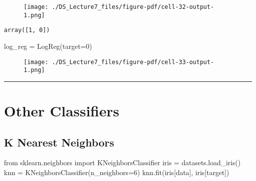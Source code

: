 \documentclass[
  letterpaper,
  DIV=11,
  numbers=noendperiod]{scrreprt}
\newenvironment{Shaded}{\begin{snugshade}}{\end{snugshade}}
\newcommand{\DecValTok}[1]{\textcolor[rgb]{0.68,0.00,0.00}{#1}}
\newcommand{\ImportTok}[1]{\textcolor[rgb]{0.00,0.46,0.62}{#1}}
\newcommand{\NormalTok}[1]{\textcolor[rgb]{0.00,0.23,0.31}{#1}}
\newcommand{\OperatorTok}[1]{\textcolor[rgb]{0.37,0.37,0.37}{#1}}
\newcommand{\StringTok}[1]{\textcolor[rgb]{0.13,0.47,0.30}{#1}}
\begin{document}
\begin{figure}[H]

{\centering \texttt{[image: ./DS\_Lecture7\_files/figure-pdf/cell-32-output-1.png]}

}

\end{figure}

\begin{verbatim}
array([1, 0])
\end{verbatim}

\begin{Shaded}
\begin{Highlighting}[]
\NormalTok{log\_reg }\OperatorTok{=}\NormalTok{ LogReg(target}\OperatorTok{=}\DecValTok{0}\NormalTok{)}
\end{Highlighting}
\end{Shaded}

\begin{figure}[H]

{\centering \texttt{[image: ./DS\_Lecture7\_files/figure-pdf/cell-33-output-1.png]}

}

\end{figure}

\begin{center}\rule{0.5\linewidth}{0.5pt}\end{center}

\hypertarget{other-classifiers}{%
\section{Other Classifiers}\label{other-classifiers}}

\hypertarget{k-nearest-neighbors}{%
\subsection{K Nearest Neighbors}\label{k-nearest-neighbors}}

\begin{Shaded}
\begin{Highlighting}[]
\ImportTok{from}\NormalTok{ sklearn.neighbors }\ImportTok{import}\NormalTok{ KNeighborsClassifier}
\NormalTok{iris }\OperatorTok{=}\NormalTok{ datasets.load\_iris()}
\NormalTok{knn }\OperatorTok{=}\NormalTok{ KNeighborsClassifier(n\_neighbors}\OperatorTok{=}\DecValTok{6}\NormalTok{)}
\NormalTok{knn.fit(iris[}\StringTok{\textquotesingle{}data\textquotesingle{}}\NormalTok{], iris[}\StringTok{\textquotesingle{}target\textquotesingle{}}\NormalTok{])}

\end{Highlighting}
\end{Shaded}
\end{document}
